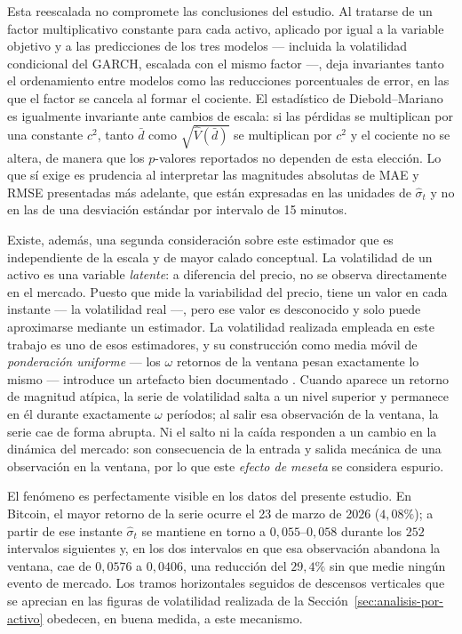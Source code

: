 \documentclass[12pt]{paper}
\begin{document}
\begin{itemize}
    Esta reescalada no compromete las conclusiones del estudio. Al tratarse de un factor multiplicativo constante para cada activo, aplicado por igual a la variable objetivo y a las predicciones de los tres modelos --- incluida la volatilidad condicional del GARCH, escalada con el mismo factor ---, deja invariantes tanto el ordenamiento entre modelos como las reducciones porcentuales de error, en las que el factor se cancela al formar el cociente. El estadístico de Diebold--Mariano es igualmente invariante ante cambios de escala: si las pérdidas se multiplican por una constante $c^2$, tanto $\bar{d}$ como $\sqrt{\widehat{V}(\bar{d})}$ se multiplican por $c^2$ y el cociente no se altera, de manera que los $p$-valores reportados no dependen de esta elección. Lo que sí exige es prudencia al interpretar las magnitudes absolutas de MAE y RMSE presentadas más adelante, que están expresadas en las unidades de $\hat{\sigma}_t$ y no en las de una desviación estándar por intervalo de 15 minutos.

    Existe, además, una segunda consideración sobre este estimador que es independiente de la escala y de mayor calado conceptual. La volatilidad de un activo es una variable \emph{latente}: a diferencia del precio, no se observa directamente en el mercado. Puesto que mide la variabilidad del precio, tiene un valor en cada instante --- la volatilidad real ---, pero ese valor es desconocido y solo puede aproximarse mediante un estimador. La volatilidad realizada empleada en este trabajo es uno de esos estimadores, y su construcción como media móvil de \emph{ponderación uniforme} --- los $\omega$ retornos de la ventana pesan exactamente lo mismo --- introduce un artefacto bien documentado \citep{wilmott2007quantfinance}. Cuando aparece un retorno de magnitud atípica, la serie de volatilidad salta a un nivel superior y permanece en él durante exactamente $\omega$ períodos; al salir esa observación de la ventana, la serie cae de forma abrupta. Ni el salto ni la caída responden a un cambio en la dinámica del mercado: son consecuencia de la entrada y salida mecánica de una observación en la ventana, por lo que este \emph{efecto de meseta} se considera espurio.

    El fenómeno es perfectamente visible en los datos del presente estudio. En Bitcoin, el mayor retorno de la serie ocurre el 23 de marzo de 2026 ($4{,}08\%$); a partir de ese instante $\hat{\sigma}_t$ se mantiene en torno a $0{,}055$--$0{,}058$ durante los $252$ intervalos siguientes y, en los dos intervalos en que esa observación abandona la ventana, cae de $0{,}0576$ a $0{,}0406$, una reducción del $29{,}4\%$ sin que medie ningún evento de mercado. Los tramos horizontales seguidos de descensos verticales que se aprecian en las figuras de volatilidad realizada de la Sección~\ref{sec:analisis-por-activo} obedecen, en buena medida, a este mecanismo.


\end{itemize}
\end{document}
